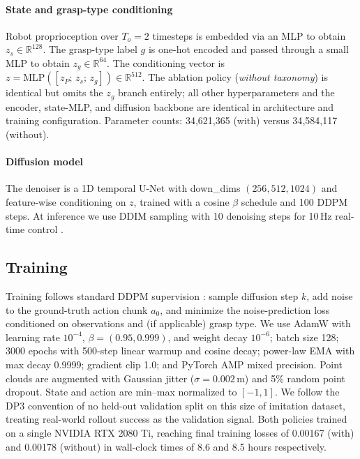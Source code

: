 \documentclass[letterpaper, 10pt, journal, twoside]{IEEEtran}
\begin{document}
\paragraph*{State and grasp-type conditioning}
Robot proprioception over $T_o = 2$ timesteps is embedded via an MLP to obtain
$z_s \in \mathbb{R}^{128}$. The grasp-type label $g$ is one-hot encoded and passed
through a small MLP to obtain $z_g \in \mathbb{R}^{64}$. The conditioning vector is
$z = \mathrm{MLP}([z_P;\, z_s;\, z_g]) \in \mathbb{R}^{512}$.
The ablation policy (\emph{without taxonomy}) is identical but omits the $z_g$ branch
entirely; all other hyperparameters and the encoder, state-MLP, and diffusion backbone
are identical in architecture and training configuration. Parameter counts:
34{,}621{,}365 (with) versus 34{,}584{,}117 (without).

\paragraph*{Diffusion model}
The denoiser is a 1D temporal U-Net with down\_dims $(256, 512, 1024)$ and
feature-wise conditioning on $z$, trained with a cosine $\beta$ schedule and 100 DDPM
steps. At inference we use DDIM sampling with 10 denoising steps for 10\,Hz real-time
control \cite{song2021ddim}.

\subsection{Training}
\label{sec:training}
Training follows standard DDPM supervision \cite{ho2020ddpm}: sample diffusion step
$k$, add noise to the ground-truth action chunk $a_0$, and minimize the noise-prediction
loss conditioned on observations and (if applicable) grasp type. We use AdamW
\cite{loshchilov2019adamw} with learning rate $10^{-4}$, $\beta=(0.95, 0.999)$, and
weight decay $10^{-6}$; batch size 128; 3000 epochs with 500-step linear warmup and
cosine decay; power-law EMA with max decay 0.9999; gradient clip 1.0; and PyTorch AMP
mixed precision. Point clouds are augmented with Gaussian jitter ($\sigma = 0.002$\,m)
and 5\% random point dropout. State and action are min--max normalized to $[-1, 1]$.
We follow the DP3 convention of no held-out validation split on this size of imitation
dataset, treating real-world rollout success as the validation signal. Both policies
trained on a single NVIDIA RTX 2080 Ti, reaching final training losses of 0.00167
(with) and 0.00178 (without) in wall-clock times of 8.6 and 8.5 hours respectively.
\end{document}
